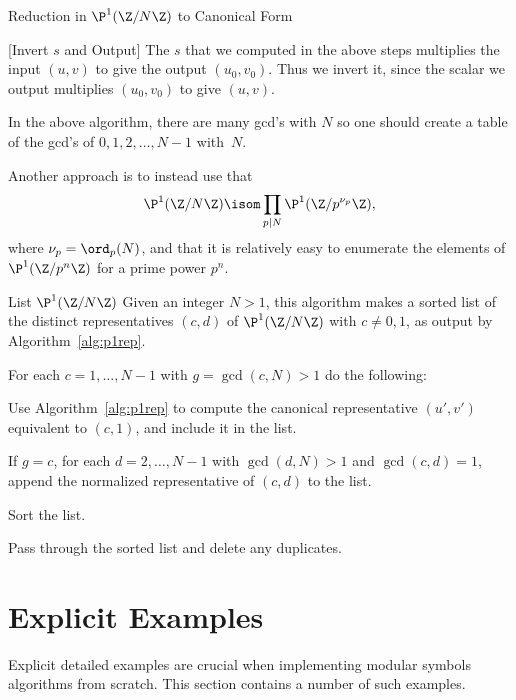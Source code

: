 \begin{algorithm}{Reduction in $\P^1(\Z/N\Z)$ 
to Canonical Form}
\begin{steps}
\begin{steps}
\item{}[Invert $s$ and Output]
The $s$ that we computed in the above steps multiplies
the input $(u,v)$ to give the output $(u_0,v_0)$.  Thus we
invert it, since the scalar  we output
multiplies $(u_0,v_0)$ to give $(u,v)$.
\end{steps}

\end{steps}

\end{algorithm}

\begin{remark}
  In the above algorithm, there are many gcd's with $N$ so one should
  create a table of the gcd's of $0,1,2,\ldots, N-1$ with~$N$.
\end{remark}
\begin{remark}
Another approach is to instead use that
 $$\P^1(\Z/N\Z)\isom \prod_{p\mid N} \P^1(\Z/p^{\nu_p}\Z),$$
where $\nu_p = \ord_p(N)$,
 and that it is relatively easy to enumerate the
 elements of $\P^1(\Z/p^n\Z)$ for a prime power $p^n$.
\end{remark}

\begin{algorithm}{List $\P^1(\Z/N\Z)$}
  Given an integer $N>1$, this algorithm makes a sorted list of the
  distinct representatives $(c,d)$ of $\P^1(\Z/N\Z)$ with 
  $c\neq 0,1$, as output by Algorithm~\ref{alg:p1rep}.
\begin{steps}
\item  For each $c=1,\ldots, N-1$ with $g = \gcd(c,N) > 1$ do the
following:
\begin{steps}
  \item Use Algorithm~\ref{alg:p1rep} to compute
the canonical representative $(u',v')$ equivalent to $(c,1)$,
and include it in the list.
  \item If $g=c$, for each $d=2,\ldots, N-1$ with $\gcd(d,N)>1$
and $\gcd(c,d)=1$, append the normalized representative
of $(c,d)$ to the list.
\end{steps}
  
\item Sort the list.

\item Pass through the sorted list and delete any duplicates.

\end{steps}

\end{algorithm}

\section{Explicit Examples}
Explicit detailed examples are crucial when implementing modular
symbols algorithms from scratch.  This section contains a number of
such examples.
